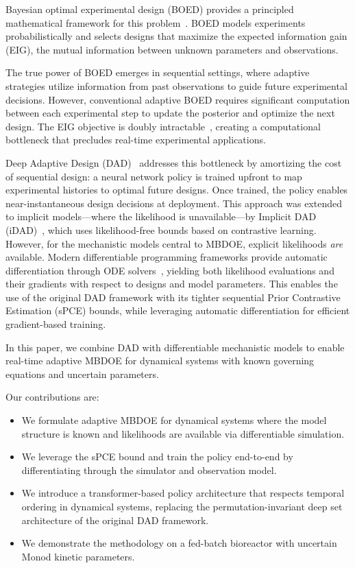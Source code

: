 \documentclass[conference]{IEEEtran}
\begin{document}
Bayesian optimal experimental design (BOED) provides a principled mathematical framework for this problem~\citep{lindley1956}. BOED models experiments probabilistically and selects designs that maximize the expected information gain (EIG), the mutual information between unknown parameters and observations.

The true power of BOED emerges in sequential settings, where adaptive strategies utilize information from past observations to guide future experimental decisions. However, conventional adaptive BOED requires significant computation between each experimental step to update the posterior and optimize the next design. The EIG objective is doubly intractable~\citep{rainforth2018nesting}, creating a computational bottleneck that precludes real-time experimental applications.

Deep Adaptive Design (DAD)~\citep{foster2021} addresses this bottleneck by amortizing the cost of sequential design: a neural network policy is trained upfront to map experimental histories to optimal future designs. Once trained, the policy enables near-instantaneous design decisions at deployment. This approach was extended to implicit models---where the likelihood is unavailable---by Implicit DAD (iDAD)~\citep{ivanova2021implicit}, which uses likelihood-free bounds based on contrastive learning.
However, for the mechanistic models central to MBDOE, explicit likelihoods \emph{are} available. Modern differentiable programming frameworks provide automatic differentiation through ODE solvers~\citep{rackauckas}, yielding both likelihood evaluations and their gradients with respect to designs and model parameters. This enables the use of the original DAD framework with its tighter sequential Prior Contrastive Estimation (sPCE) bounds, while leveraging automatic differentiation for efficient gradient-based training.

In this paper, we combine DAD with differentiable mechanistic models to enable real-time adaptive MBDOE for dynamical systems with known governing equations and uncertain parameters.

Our contributions are:
\begin{itemize}
\item We formulate adaptive MBDOE for dynamical systems where the model structure is known and likelihoods are available via differentiable simulation.
\item We leverage the sPCE bound and train the policy end-to-end by differentiating through the simulator and observation model.
\item We introduce a transformer-based policy architecture that respects temporal ordering in dynamical systems, replacing the permutation-invariant deep set architecture of the original DAD framework.
\item We demonstrate the methodology on a fed-batch bioreactor with uncertain Monod kinetic parameters.
\end{itemize}
\end{document}
